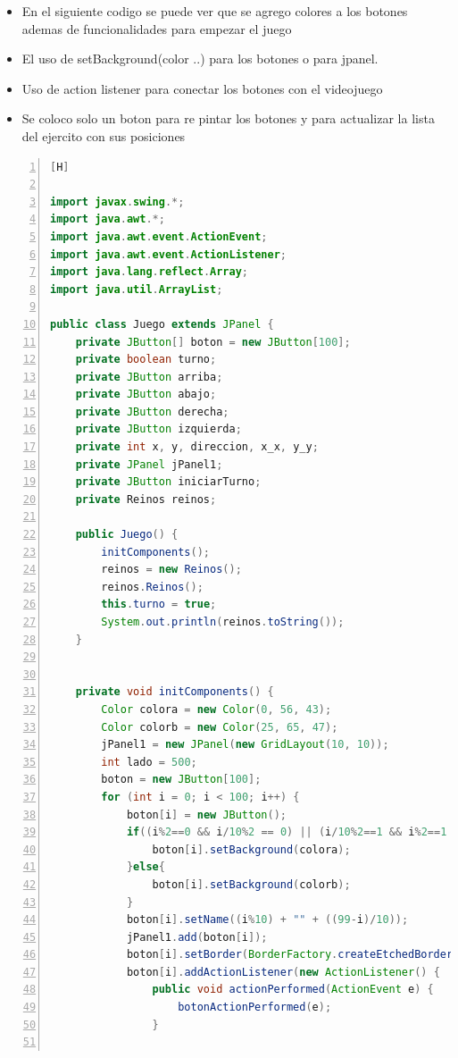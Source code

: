 \documentclass{article}
\begin{document}
			
		\begin{itemize}
			\item En el siguiente codigo se puede ver que se agrego colores a los botones ademas de funcionalidades para empezar el juego
			\item El uso de setBackground(color ..) para los botones o para jpanel.
			\item Uso de action listener para conectar los botones con el videojuego
			\item Se coloco solo un boton para re pintar los botones y para actualizar la lista del ejercito con sus posiciones
			
		\end{itemize}
		\begin{lstlisting}[language=Java,caption={Creando la interfaz de tablero},numbers=left,][H]

import javax.swing.*;
import java.awt.*;
import java.awt.event.ActionEvent;
import java.awt.event.ActionListener;
import java.lang.reflect.Array;
import java.util.ArrayList;

public class Juego extends JPanel {
    private JButton[] boton = new JButton[100];
    private boolean turno;
    private JButton arriba;
    private JButton abajo;
    private JButton derecha;
    private JButton izquierda;
    private int x, y, direccion, x_x, y_y;
    private JPanel jPanel1;
    private JButton iniciarTurno;
    private Reinos reinos;

    public Juego() {
        initComponents();
        reinos = new Reinos();
        reinos.Reinos();
        this.turno = true;
        System.out.println(reinos.toString());
    }


    private void initComponents() {
        Color colora = new Color(0, 56, 43);
        Color colorb = new Color(25, 65, 47);
        jPanel1 = new JPanel(new GridLayout(10, 10));
        int lado = 500;
        boton = new JButton[100];
        for (int i = 0; i < 100; i++) {
            boton[i] = new JButton();
            if((i%2==0 && i/10%2 == 0) || (i/10%2==1 && i%2==1 )){
                boton[i].setBackground(colora);
            }else{
                boton[i].setBackground(colorb);
            }
            boton[i].setName((i%10) + "" + ((99-i)/10));
            jPanel1.add(boton[i]);
            boton[i].setBorder(BorderFactory.createEtchedBorder());
            boton[i].addActionListener(new ActionListener() {
                public void actionPerformed(ActionEvent e) {
                    botonActionPerformed(e);
                }
                

\end{lstlisting}
\end{document}
